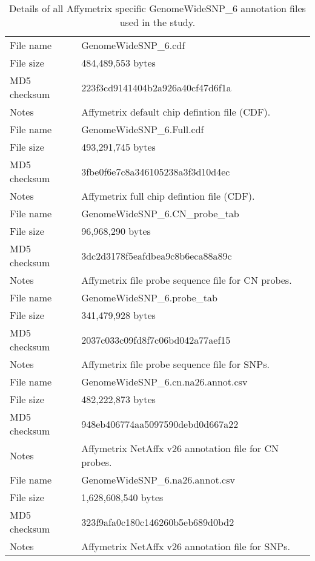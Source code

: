 \documentclass[10pt,a4paper]{article}
\begin{document}
\begin{table}[htp]
\begin{center}
\begin{tabular}{lp{}}
\hline
File name    & GenomeWideSNP\_6.cdf \\
File size    & 484,489,553 bytes \\
MD5 checksum & 223f3cd9141404b2a926a40cf47d6f1a \\
Notes        & Affymetrix default chip defintion file (CDF). \\
\hline
File name    & GenomeWideSNP\_6.Full.cdf \\
File size    & 493,291,745 bytes \\
MD5 checksum & 3fbe0f6e7c8a346105238a3f3d10d4ec \\
Notes        & Affymetrix full chip defintion file (CDF). \\
\hline
File name    & GenomeWideSNP\_6.CN\_probe\_tab \\
File size    & 96,968,290 bytes \\
MD5 checksum & 3dc2d3178f5eafdbea9c8b6eca88a89c \\
Notes        & Affymetrix file probe sequence file for CN probes. \\
\hline
File name    & GenomeWideSNP\_6.probe\_tab \\
File size    & 341,479,928 bytes \\
MD5 checksum & 2037c033c09fd8f7c06bd042a77aef15 \\
Notes        & Affymetrix file probe sequence file for SNPs. \\
\hline
File name    & GenomeWideSNP\_6.cn.na26.annot.csv \\
File size    & 482,222,873 bytes \\
MD5 checksum & 948eb406774aa5097590debd0d667a22 \\
Notes        & Affymetrix NetAffx v26 annotation file for CN probes. \\
\hline
File name    & GenomeWideSNP\_6.na26.annot.csv \\
File size    & 1,628,608,540 bytes \\
MD5 checksum & 323f9afa0c180c146260b5eb689d0bd2 \\
Notes        & Affymetrix NetAffx v26 annotation file for SNPs. \\
\hline
\end{tabular}
\end{center}
\caption{Details of all Affymetrix specific GenomeWideSNP\_6 annotation files used in the study.}
\label{tblGWSSixAffymetrix}
\end{table}
\end{document}
